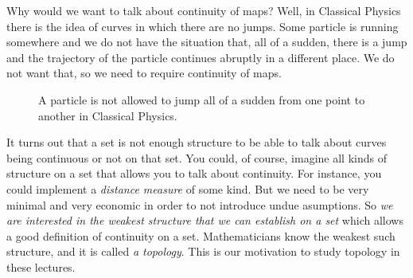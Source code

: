 Why would we want to talk about continuity of maps? Well, in Classical Physics there is
the idea of curves in which there are no jumps. Some particle is running somewhere and
we do not have the situation that, all of a sudden, there is a jump and the trajectory
of the particle continues abruptly in a different place. We do not want that, so we need
to require continuity of maps.
\begin{figure}[ht]
  \centering
  \def\scl{1}
  \caption{A particle is not allowed to jump all of a sudden from one point to another
    in Classical Physics.}
  \label{fig:topspac-nojumps}
\end{figure}

It turns out that a set is not enough structure to be able to talk about curves being
continuous or not on that set. You could, of course, imagine all kinds of structure on
a set that allows you to talk about continuity. For instance, you could implement a
\emph{distance measure} of some kind.
But we need to be very minimal and very economic in order to not introduce undue
asumptions.
So \emph{we are interested in the weakest structure that we can establish on a set}
which allows
a good definition of continuity on a set. Mathematicians know the weakest such
structure, and it is called \emph{a topology}. This is our motivation to study topology
in these lectures.

